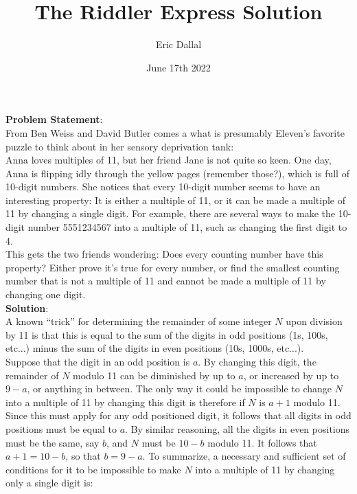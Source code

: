 \documentclass[10pt,a4paper]{article}
\title{The Riddler Express Solution}
\date{June 17th 2022}
\author{Eric Dallal}
\begin{document}
\maketitle
\textbf{Problem Statement}:\\

From Ben Weiss and David Butler comes a what is presumably Eleven’s favorite puzzle to think about in her sensory deprivation tank:\\

Anna loves multiples of 11, but her friend Jane is not quite so keen. One day, Anna is flipping idly through the yellow pages (remember those?), which is full of 10-digit numbers. She notices that every 10-digit number seems to have an interesting property: It is either a multiple of 11, or it can be made a multiple of 11 by changing a single digit. For example, there are several ways to make the 10-digit number 5551234567 into a multiple of 11, such as changing the first digit to 4.\\

This gets the two friends wondering: Does every counting number have this property? Either prove it’s true for every number, or find the smallest counting number that is not a multiple of 11 and cannot be made a multiple of 11 by changing one digit.\\

\textbf{Solution}:\\
A known ``trick'' for determining the remainder of some integer $N$ upon division by 11 is that this is equal to the sum of the digits in odd positions (1s, 100s, etc...) minus the sum of the digits in even positions (10s, 1000s, etc...).\\

Suppose that the digit in an odd position is $a$. By changing this digit, the remainder of $N$ modulo 11 can be diminished by up to $a$, or increased by up to $9 - a$, or anything in between. The only way it could be impossible to change $N$ into a multiple of 11 by changing this digit is therefore if $N$ is $a + 1$ modulo 11. Since this must apply for any odd positioned digit, it follows that all digits in odd positions must be equal to $a$. By similar reasoning, all the digits in even positions must be the same, say $b$, and $N$ must be $10 - b$ modulo 11. It follows that $a + 1 = 10 - b$, so that $b = 9 - a$. To summarize, a necessary and sufficient set of conditions for it to be impossible to make $N$ into a multiple of 11 by changing only a single digit is:\\
\end{document}
